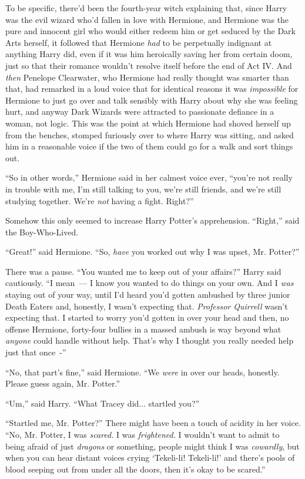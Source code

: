 To be specific, there'd been the fourth-year witch explaining that, since Harry was the evil wizard who'd fallen in love with Hermione, and Hermione was the pure and innocent girl who would either redeem him or get seduced by the Dark Arts herself, it followed that Hermione \emph{had} to be perpetually indignant at anything Harry did, even if it was him heroically saving her from certain doom, just so that their romance wouldn't resolve itself before the end of Act IV. And \emph{then} Penelope Clearwater, who Hermione had really thought was smarter than that, had remarked in a loud voice that for identical reasons it was \emph{impossible} for Hermione to just go over and talk sensibly with Harry about why she was feeling hurt, and anyway Dark Wizards were attracted to passionate defiance in a woman, not logic. This was the point at which Hermione had shoved herself up from the benches, stomped furiously over to where Harry was sitting, and asked him in a reasonable voice if the two of them could go for a walk and sort things out.

``So in other words,'' Hermione said in her calmest voice ever, ``you're not really in trouble with me, I'm still talking to you, we're still friends, and we're still studying together. We're \emph{not} having a fight. Right?''

Somehow this only seemed to increase Harry Potter's apprehension. ``Right,'' said the Boy-Who-Lived.

``Great!'' said Hermione. ``So, \emph{have} you worked out why I was upset, Mr. Potter?''

There was a pause. ``You wanted me to keep out of your affairs?'' Harry said cautiously. ``I mean~--- I know you wanted to do things on your own. And I \emph{was} staying out of your way, until I'd heard you'd gotten ambushed by three junior Death Eaters and, honestly, I wasn't expecting that. \emph{Professor Quirrell} wasn't expecting that. I started to worry you'd gotten in over your head and then, no offense Hermione, forty-four bullies in a massed ambush is way beyond what \emph{anyone} could handle without help. That's why I thought you really needed help just that once~-''

``No, that part's fine,'' said Hermione. ``We \emph{were} in over our heads, honestly. Please guess again, Mr. Potter.''

``Um,'' said Harry. ``What Tracey did... startled you?''

``Startled me, Mr. Potter?'' There might have been a touch of acidity in her voice. ``No, Mr. Potter, I was \emph{scared.} I was \emph{frightened.} I wouldn't want to admit to being afraid of just \emph{dragons} or something, people might think I was \emph{cowardly}, but when you can hear distant voices crying `Tekeli-li! Tekeli-li!' and there's pools of blood seeping out from under all the doors, then it's okay to be scared.''

